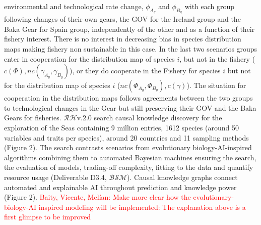 \documentclass[11pt, a4paper]{article} %
\begin{document}
{environmental and technological rate change, $\phi_{A_{g}}$ and
$\phi_{B_{g}}$ with each group following changes of their own gears,
the GOV for the Ireland group and the Baka Gear for Spain group,
independently of the other and as a function of their fishery
interest. There is no interest in decreasing bias in species
distribution maps making fishery non sustainable in this case. In the
last two scenarios groups enter in cooperation for the distribution
map of species $i$, but not in the fishery
($c(\Phi), nc(\gamma_{A_{g}},\gamma_{B_{g}})$), or they do cooperate
in the Fishery for species $i$ but not for the distribution map of
species $i$ ($nc(\Phi_{A_{g}},\Phi_{B_{g}}), c(\gamma)$). The
situation for cooperation in the distribution maps follows agreements
between the two groups to technological changes in the Gear but still
preserving their GOV and the Baka Gears for
fisheries. $\mathcal{RH}$v.2.0 search causal knowledge discovery for
the exploration of the Seas containing 9 million entries, 1612 species
(around 50 variables and traits per species), around 20 countries and
11 sampling methods (Figure 2). The search contrasts scenarios from
evolutionary biology-AI-inspired algorithms combining them to
automated Bayesian machines ensuring the search, the evaluation of
models, trading-off complexity, fitting to the data and quantify
resource usage (Deliverable D3.4,
$\mathcal{BSM}$)\citep{Guimera2020,Steinruecken}. Causal knowledge
graphs connect automated and explainable AI throughout prediction and
knowledge power (Figure 2).} \textcolor{red}{Baity, Vicente, Mel\'ian:
Make more clear how the evolutionary-biology-AI inspired modeling will
be implemented: The explanation above is a first glimpse to be
improved}

\end{document}
